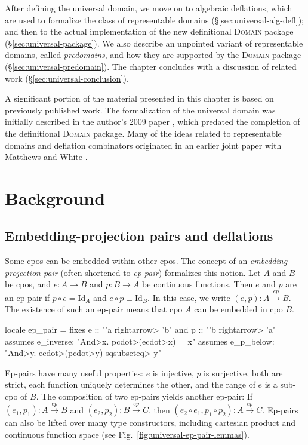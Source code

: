 After defining the universal domain, we move on to algebraic deflations, which are used to formalize the class of representable domains (\S\ref{sec:universal-alg-defl}); and then to the actual implementation of the new definitional \textsc{Domain} package (\S\ref{sec:universal-package}). We also describe an unpointed variant of representable domains, called \emph{predomains}, and how they are supported by the \textsc{Domain} package (\S\ref{sec:universal-predomain}). The chapter concludes with a discussion of related work (\S\ref{sec:universal-conclusion}).

A significant portion of the material presented in this chapter is based on previously published work. The formalization of the universal domain was initially described in the author's 2009 paper \cite{huffman09universal}, which predated the completion of the definitional \textsc{Domain} package. Many of the ideas related to representable domains and deflation combinators originated in an earlier joint paper with Matthews and White \cite{huffman05axiomatic}.

\section{Background}
\label{sec:universal-background}

\subsection{Embedding-projection pairs and deflations}

Some cpos can be embedded within other cpos. The concept of an \emph{embedding-projection pair} (often shortened to \emph{ep-pair}) formalizes this notion. Let $A$ and $B$ be cpos, and $e : A \rightarrow B$ and $p : B \rightarrow A$ be continuous functions. Then $e$ and $p$ are an ep-pair if $p \circ e = \mathrm{Id}_A$ and $e \circ p \sqsubseteq \mathrm{Id}_B$. In this case, we write $(e, p) : A \stackrel{ep}{\to} B$. The existence of such an ep-pair means that cpo $A$ can be embedded in cpo $B$.
%
\begin{isacode}
locale ep_pair =
  fixes e :: "'a \<rightarrow> 'b" and p :: "'b \<rightarrow> 'a"
  assumes e_inverse: "\<And>x. p\<cdot>(e\<cdot>x) = x"
  assumes e_p_below: "\<And>y. e\<cdot>(p\<cdot>y) \<sqsubseteq> y"
\end{isacode}
%
Ep-pairs have many useful properties: $e$ is injective, $p$ is surjective, both are strict, each function uniquely determines the other, and the range of $e$ is a sub-cpo of $B$. The composition of two ep-pairs yields another ep-pair: If $(e_1, p_1) : A \stackrel{ep}{\to} B$ and $(e_2, p_2) : B \stackrel{ep}{\to} C$, then $(e_2 \circ e_1, p_1 \circ p_2) : A \stackrel{ep}{\to} C$. Ep-pairs can also be lifted over many type constructors, including cartesian product and continuous function space (see Fig.~\ref{fig:universal-ep-pair-lemmas}).

